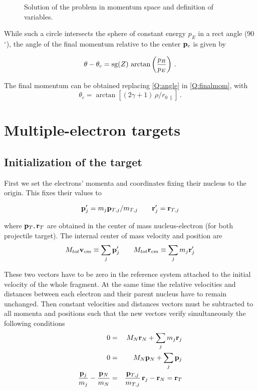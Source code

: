 \begin{figure}%
  \centering
  \caption{Solution of the problem in momentum space and definition of
  variables.
  \label{f:ctmc2}}
\end{figure}

While such a circle intersects the sphere of constant energy $p_{E}$ in
a rect angle (90$^{\circ}$), the angle of the final momentum relative to the
center $\mathbf{p}_{c}$ is given by

\begin{equation}\label{Q:angle}
\theta - \theta_{c} = {\rm sg}(Z) \, \arctan{\left( \frac{p_{R}}{p_{E}}
\right)} \ .
\end{equation}

The final momentum can be obtained replacing \ref{Q:angle} in
\ref{Q:finalmom}, with
\[
\theta_{c} = \arctan\left[(2 \gamma + 1) \, \rho / r_{0\, \|} \right]
\,.
\]

\section{Multiple-electron targets}

\subsection{Initialization of the target}
\label{S:Initi-targe}

First we set the electrons' momenta and coordinates fixing their
nucleus to the origin. This fixes their values to

\[
\mathbf{p}'_{j} = m_{j} \mathbf{p}_{T,j}/m_{T,j} \qquad \mathbf{r}'_{j} =
\mathbf{r}_{T,j}
\]

where $\mathbf{p}_{T}, \mathbf{r}_{T}$ are obtained in the center of mass
nucleus-electron (for both projectile target). The internal center of
mass velocity and position are
%
\[
M_{tot} \mathbf{v}_{cm} \equiv \sum_{j} \mathbf{p}'_{j}  \qquad M_{tot}
\mathbf{r}_{cm} \equiv \sum_{j} m_{j} \mathbf{r}'_{j}
\]

These two vectors have to be zero in the reference system attached to
the initial velocity of the whole fragment. At the same time the
relative velocities and distances between each electron and their
parent nucleus have to remain unchanged. Then constant velocities and
distances vectors must be subtracted to all momenta and positions such
that the new vectors verify simultaneously the following conditions
\begin{eqnarray*}
  0 &=& M_{N} \mathbf{r}_{N} + \sum_{j} m_{j} \mathbf{r}_{j} \\
  0 &=& M_{N} \mathbf{p}_{N} + \sum_{j} \mathbf{p}_{j} \\
\frac{\mathbf{p}_{j}}{m_{j}} - \frac{\mathbf{p}_{N}}{m_{N}} &=&
\frac{\mathbf{p}_{T,j}}{m_{T,j}}\, \mathbf{r}_{j}-\mathbf{r}_{N} = \mathbf{r}_{T}
\end{eqnarray*}

